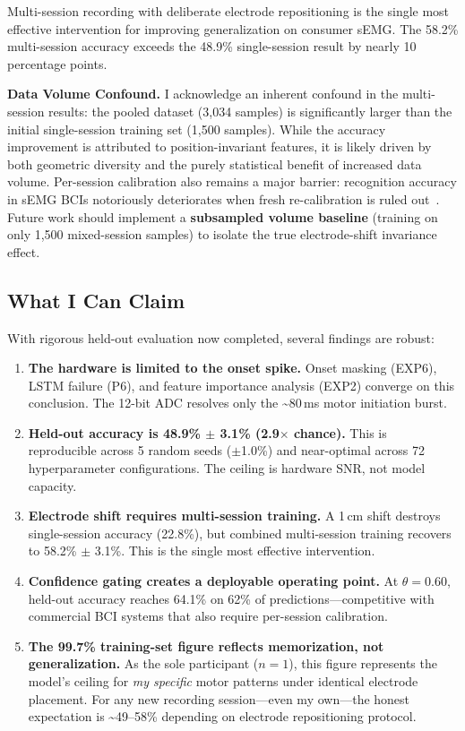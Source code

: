 \documentclass[11pt, a4paper]{article}
\begin{document}
Multi-session recording with deliberate electrode repositioning is the single most effective intervention for improving generalization on consumer sEMG. The 58.2\% multi-session accuracy exceeds the 48.9\% single-session result by nearly 10 percentage points.

\textbf{Data Volume Confound.} I acknowledge an inherent confound in the multi-session results: the pooled dataset (3,034 samples) is significantly larger than the initial single-session training set (1,500 samples). While the accuracy improvement is attributed to position-invariant features, it is likely driven by both geometric diversity and the purely statistical benefit of increased data volume. Per-session calibration also remains a major barrier: recognition accuracy in sEMG BCIs notoriously deteriorates when fresh re-calibration is ruled out~\cite{yousefi2022}. Future work should implement a \textbf{subsampled volume baseline} (training on only 1,500 mixed-session samples) to isolate the true electrode-shift invariance effect.

\subsection{What I Can Claim}
\label{sec:claims}

With rigorous held-out evaluation now completed, several findings are robust:

\begin{enumerate}
    \item \textbf{The hardware is limited to the onset spike.} Onset masking (EXP6), LSTM failure (P6), and feature importance analysis (EXP2) converge on this conclusion. The 12-bit ADC resolves only the \textasciitilde80\,ms motor initiation burst.

    \item \textbf{Held-out accuracy is 48.9\% $\pm$ 3.1\% (2.9$\times$ chance).} This is reproducible across 5 random seeds ($\pm$1.0\%) and near-optimal across 72 hyperparameter configurations. The ceiling is hardware SNR, not model capacity.

    \item \textbf{Electrode shift requires multi-session training.} A 1\,cm shift destroys single-session accuracy (22.8\%), but combined multi-session training recovers to 58.2\% $\pm$ 3.1\%. This is the single most effective intervention.

    \item \textbf{Confidence gating creates a deployable operating point.} At $\theta = 0.60$, held-out accuracy reaches 64.1\% on 62\% of predictions---competitive with commercial BCI systems that also require per-session calibration.

    \item \textbf{The 99.7\% training-set figure reflects memorization, not generalization.} As the sole participant ($n=1$), this figure represents the model's ceiling for \emph{my specific} motor patterns under identical electrode placement. For any new recording session---even my own---the honest expectation is \textasciitilde49--58\% depending on electrode repositioning protocol.
\end{enumerate}
\end{document}
